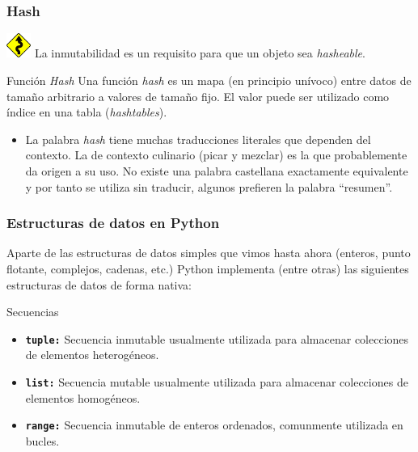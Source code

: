 \documentclass{beamer}
\begin{document}
\begin{frame}
    \frametitle{Hash}
    \includegraphics[height=0.8cm, width=0.8cm]{figuras/sin.png}
    La inmutabilidad es un requisito para que un objeto sea {\em hasheable}.
    \begin{block}{Función {\em Hash}}
        Una función {\em hash} es un mapa (en principio unívoco) entre datos de tamaño arbitrario a valores de tamaño fijo. El valor puede ser utilizado como índice en una tabla ({\em hashtables}).
    \end{block}   
    \begin{itemize}
        \item La palabra {\em hash} tiene muchas traducciones literales que dependen del contexto. La de contexto culinario (picar y mezclar) es la que probablemente da origen a su uso. 
        No existe una palabra castellana exactamente equivalente y por tanto se utiliza sin traducir, algunos prefieren la palabra ``resumen''. 
    \end{itemize}   
\end{frame}

\begin{frame}
\frametitle{Estructuras de datos en Python}
    Aparte de las estructuras de datos simples que vimos hasta ahora (enteros, punto flotante, complejos, cadenas, etc.) Python implementa (entre otras) las siguientes
    estructuras de datos de forma nativa:
    \begin{block}{Secuencias}
        \begin{itemize}
            \item {\tt \bf tuple:} Secuencia inmutable usualmente utilizada para almacenar colecciones de elementos heterogéneos.
            \item {\tt \bf list:} Secuencia mutable usualmente utilizada para almacenar colecciones de elementos homogéneos.
            \item {\tt \bf range:} Secuencia inmutable de enteros ordenados, comunmente utilizada en bucles.       
        \end{itemize}
    \end{block}
\end{frame}
\end{document}
